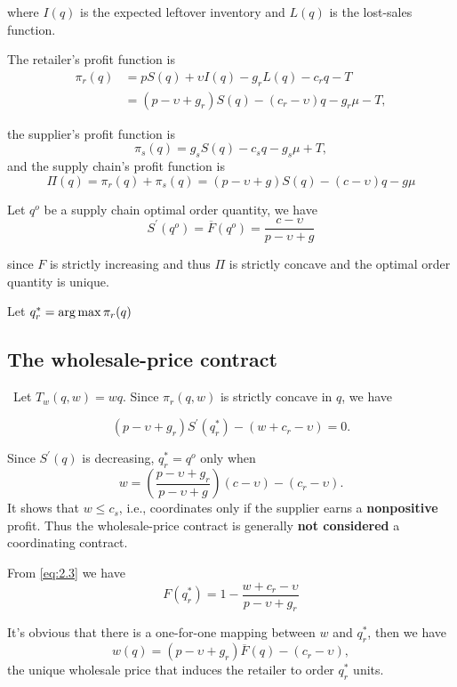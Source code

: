 where $I(q)$ is the expected leftover inventory and $L(q)$ is the lost-sales function.

The retailer's profit function is 
\begin{align*}
    \pi_r(q)&=pS(q)+\upsilon I(q)-g_r L(q)-c_r q - T\\
    &=(p-\upsilon+g_r)S(q)-(c_r-\upsilon)q-g_r\mu-T,
\end{align*}

the supplier's profit function is 
\begin{equation*}
    \pi_s(q)=g_s S(q)-c_s q-g_s\mu + T,
\end{equation*}
and the supply chain's profit function is 
\begin{equation}
    \Pi(q)=\pi_r(q)+\pi_s(q)=(p-\upsilon+g)S(q)-(c-\upsilon)q-g\mu
\end{equation}

Let $q^o$ be a supply chain optimal order quantity, we have 
\begin{equation}
    S^\prime(q^o)=\overline F(q^o)=\frac{c-\upsilon}{p-\upsilon+g}
\end{equation}

since $F$ is strictly increasing and thus $\Pi$ is strictly concave and the optimal order quantity is unique.

Let $q_r^*=\operatorname*{arg\,max} \pi_r(q)$

\subsection{The wholesale-price contract}\
Let $T_w(q,w)=w q$. Since $\pi_r(q,w)$ is strictly concave in $q$, we have 

\begin{equation}\label{eq:2.3}
    (p-\upsilon+g_r)S^\prime(q_r^*)-(w+c_r-\upsilon)=0.
\end{equation}

Since $S^\prime(q)$ is decreasing, $q_r^*=q^o$ only when
$$
w=(\frac{p-\upsilon+g_r}{p-\upsilon+g})(c-\upsilon)-(c_r-\upsilon).
$$
It shows that $w\leq c_s$, i.e., coordinates only if the supplier earns a \textbf{nonpositive} profit. Thus the wholesale-price contract is generally \textbf{not considered} a coordinating contract.

From \autoref{eq:2.3} we have 
$$F(q_r^*)=1-\frac{w+c_r-\upsilon}{p-\upsilon+g_r}$$

It's obvious that there is a one-for-one mapping between $w$ and $q_r^*$, then we have $$w(q)=(p-\upsilon+g_r)\overline{F}(q)-(c_r-\upsilon),$$
the unique wholesale price that induces the retailer to order $q_r^*$ units.





   